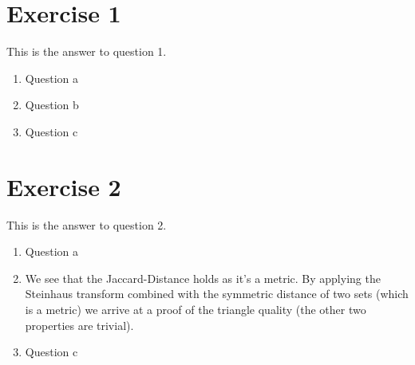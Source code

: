 \documentclass{article}
\date{}
\begin{document}
	
\section{Exercise 1}
This is the answer to question 1.
\begin{enumerate}
	
	\item Question a
	
	\item Question b
	
	\item Question c
	
\end{enumerate}

\section{Exercise 2}
This is the answer to question 2.
\begin{enumerate}
	
	\item Question a
	
	\item We see that the Jaccard-Distance holds as it's a metric. By applying the Steinhaus transform combined with the symmetric distance of two sets (which is a metric) we arrive at a proof of the triangle quality (the other two properties are trivial).
	
	
	\item Question c
	
\end{enumerate}
\end{document}
